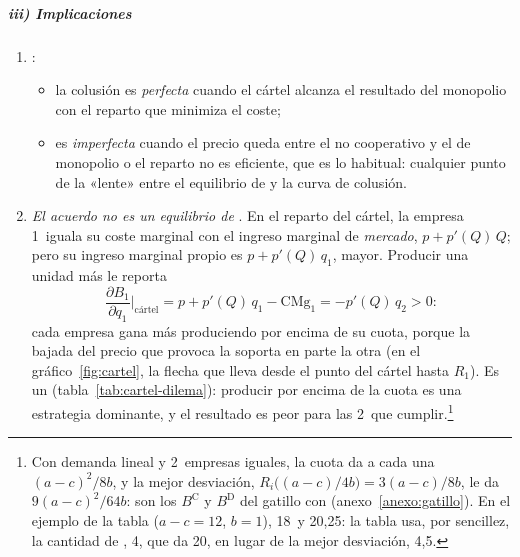 \documentclass[11pt]{article}
\begin{document}
\subparagraph{iii) Implicaciones}

\begin{enumerate}
\item {}:
  \begin{itemize}
  \item la colusión es \emph{perfecta} cuando el cártel alcanza el resultado del monopolio con el reparto que minimiza el coste;
  \item es \emph{imperfecta} cuando el precio queda entre el no cooperativo y el de monopolio o el reparto no es eficiente, que es lo habitual: cualquier punto de la «lente» entre el equilibrio de  y la curva de colusión.
  \end{itemize}
\item \emph{El acuerdo no es un equilibrio de }. En el reparto del cártel, la empresa 1~iguala su coste marginal con el ingreso marginal de \emph{mercado}, $p+p'(Q)\,Q$; pero su ingreso marginal propio es $p+p'(Q)\,q_1$, mayor. Producir una unidad más le reporta
  \[
  \frac{\partial B_1}{\partial q_1}\bigg|_{\text{cártel}}=p+p'(Q)\,q_1-\mathrm{CMg}_1=-p'(Q)\,q_2>0:
  \]
  cada empresa gana más produciendo por encima de su cuota, porque la bajada del precio que provoca la soporta en parte la otra (en el gráfico~\ref{fig:cartel}, la flecha que lleva desde el punto del cártel hasta $R_1$). Es un   (tabla~\ref{tab:cartel-dilema}): producir por encima de la cuota es una estrategia dominante, y el resultado es peor para las 2~que cumplir.\footnote{Con demanda lineal y 2~empresas iguales, la cuota da a cada una $(a-c)^2/8b$, y la mejor desviación, $R_i\big((a-c)/4b\big)=3(a-c)/8b$, le da $9(a-c)^2/64b$: son los $B^{\mathrm C}$ y $B^{\mathrm D}$ del gatillo con  (anexo~\ref{anexo:gatillo}). En el ejemplo de la tabla ($a-c=12$, $b=1$), 18~y 20,25: la tabla usa, por sencillez, la cantidad de , 4, que da 20, en lugar de la mejor desviación, 4,5.}
\end{enumerate}
\end{document}
